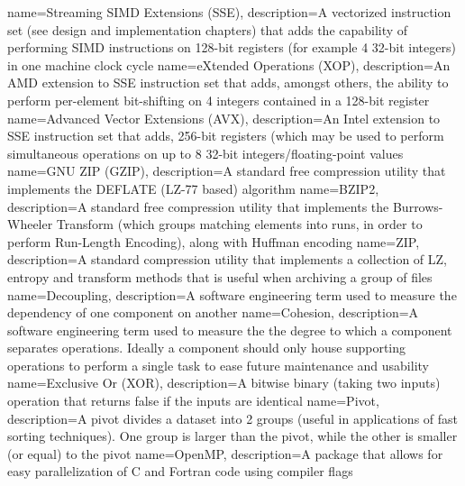  {
  name={Streaming SIMD Extensions (SSE)},
  description={A vectorized instruction set (see design and implementation chapters) that adds the capability of performing SIMD instructions on 128-bit registers (for example
  4 32-bit integers) in one machine clock cycle}
 }
 {
  name={eXtended Operations (XOP)},
  description={An AMD extension to SSE instruction set that adds, amongst others, the ability to perform per-element bit-shifting on 4 integers contained in a 128-bit 
  register}
 }
 {
  name={Advanced Vector Extensions (AVX)},
  description={An Intel extension to SSE instruction set that adds, 256-bit registers (which may be used to perform simultaneous operations on up to 8 32-bit 
  integers/floating-point values}
 }
 {
  name={GNU ZIP (GZIP)},
  description={A standard free compression utility that implements the DEFLATE (LZ-77 based) algorithm}
 }
 {
  name={BZIP2},
  description={A standard free compression utility that implements the Burrows-Wheeler Transform (which groups matching elements into runs, in order to perform
  Run-Length Encoding), along with Huffman encoding}
 }
 {
  name={ZIP},
  description={A standard compression utility that implements a collection of LZ, entropy and transform methods that is useful when archiving a group of files}
 }
 {
  name={Decoupling},
  description={A software engineering term used to measure the dependency of one component on another}
 }
 {
  name={Cohesion},
  description={A software engineering term used to measure the the degree to which a component separates operations. Ideally a component should only house supporting
  operations to perform a single task to ease future maintenance and usability}
 }
 {
  name={Exclusive Or (XOR)},
  description={A bitwise binary (taking two inputs) operation that returns false if the inputs are identical}
 }
 {
  name={Pivot},
  description={A pivot divides a dataset into 2 groups (useful in applications of fast sorting techniques). One group is larger than the pivot, while the other is smaller (or equal)
  to the pivot}
 }
 {
  name={OpenMP},
  description={A package that allows for easy parallelization of C and Fortran code using compiler flags}
 }
